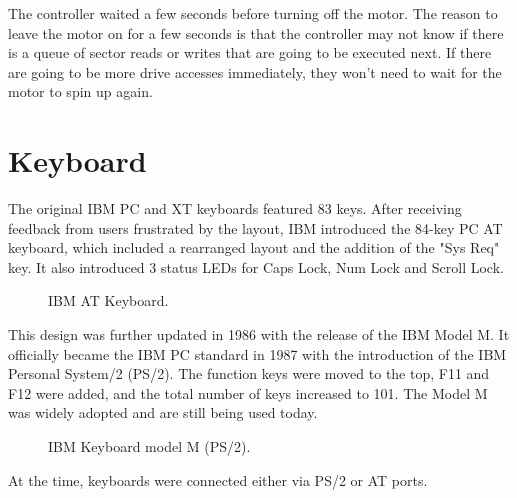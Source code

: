 \documentclass[book.tex]{subfiles}
\begin{document}
The controller waited a few seconds before turning off the motor. The reason to leave the motor on for a few seconds is that the controller may not know if there is a queue of sector reads or writes that are going to be executed next. If there are going to be more drive accesses immediately, they won't need to wait for the motor to spin up again.\\

\section{Keyboard}
The original IBM PC and XT keyboards featured 83 keys. After receiving feedback from users frustrated by the layout, IBM introduced the 84-key PC AT keyboard, which included a rearranged layout and the addition of the "Sys Req" key. It also introduced 3 status LEDs for Caps Lock, Num Lock and Scroll Lock.\\

\begin{figure}[H] 
  \centering 
  \caption{IBM AT Keyboard.}
\end{figure}

\par
This design was further updated in 1986 with the release of the IBM Model M. It officially became the IBM PC standard in 1987 with the introduction of the IBM Personal System/2 (PS/2). The function keys were moved to the top, F11 and F12 were added, and the total number of keys increased to 101. The Model M was widely adopted and are still being used today.\\

\begin{figure}[H] 
  \centering 
  \caption{IBM Keyboard model M (PS/2).}
\end{figure}

At the time, keyboards were connected either via PS/2 or AT ports.\\
\end{document}
